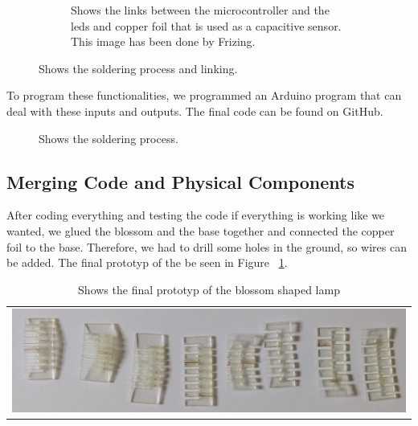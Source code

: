 \documentclass[doc.tex]{subfiles}
\begin{document}
\begin{figure}[H]
\begin{subfigure}{.45\textwidth}
                \caption{Shows the links between the microcontroller and the leds and copper foil that is 
                used as a capacitive sensor. This image has been done by Frizing. \cite{fritzing}}
                \label{fig:01_LaserCut}
                \vspace{6mm}
              \end{subfigure}
            \caption{Shows the soldering process and linking.}
            \label{fig:laserCutTests}
        \end{figure}

        \noindent
        To program these functionalities, we programmed an Arduino program that can deal with these inputs 
        and outputs. The final code can be found on GitHub. %

        
        \begin{figure}[H]
            \centering
            
            
            \caption{Shows the soldering process.}
            \label{fig:solderingProcess}
        \end{figure}
        \noindent

    \subsection{Merging Code and Physical Components}
        \begin{flushleft}
            After coding everything and testing the code if everything is working like we wanted, we glued
            the blossom and the base together and connected the copper foil to the base. Therefore, we had 
            to drill some holes in the ground, so wires can be added. The final prototyp of the be seen in 
            Figure ~\ref{fig:finalPrototyp}.
        \end{flushleft}

        \begin{table}[h!]
            \centering
            \begin{tabular}{c}
              \centering
              \includegraphics[width=.8\linewidth]{images/process/01_LaserCut.jpg}
            \end{tabular}
            \caption{Shows the final prototyp of the blossom shaped lamp}
            \label{fig:finalPrototyp}
        \end{table}
\end{document}
